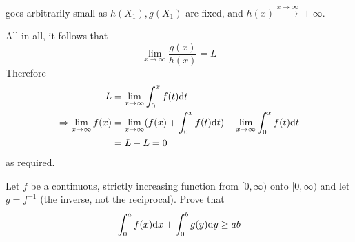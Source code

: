 \documentclass[a4paper, 12pt]{article}
\begin{document}
\begin{solution}
   goes arbitrarily small as $h(X_1), g(X_1)$ are fixed, and $h(x) \xrightarrow{x \to \infty} +\infty$.

   All in all, it follows that \begin{equation*}
   \lim_{x \to \infty} \frac{g(x)}{h(x)} = L
   \end{equation*}
   Therefore \begin{align*}
    L &= \lim_{x \to \infty} \int_{0}^{x} f(t) \mathrm{d} t \\
    \Rightarrow \lim_{x \to \infty} f(x) &= \lim_{x \to \infty}(f(x) + \int_{0}^{x} f(t) \mathrm{d} t) - \lim_{x \to \infty} \int_{0}^{x} f(t) \mathrm{d} t \\
    &= L - L = 0
   \end{align*}
   as required.
\end{solution}

\begin{problem} 
Let $f$ be a continuous, strictly increasing function from $[0, \infty)$ onto $[0, \infty)$ and let $g = f^{-1}$ (the inverse, not the reciprocal). Prove that \begin{equation*}
\int_{0}^{a} f(x) \mathrm{d} x + \int_{0}^{b} g(y) \mathrm{d} y \geq ab
\end{equation*}
\end{problem}
\end{document}
